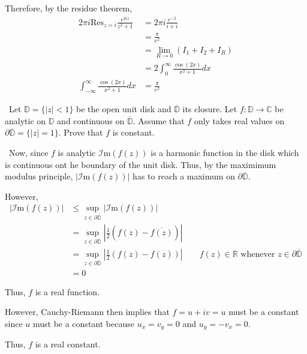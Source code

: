 \documentclass[12pt]{Homework}
\newcommand{\im}{\mathscr{I}\text{m}}
\newcommand{\res}{\text{Res}}
\begin{document}
\begin{solution}
Therefore, by the residue theorem, 
\begin{align*}
    2\pi i\res_{z=i}\frac{e^{2iz}}{z^2+1}&=2\pi i\frac{e^{-2}}{i+i}\\
    &=\frac{\pi}{e^2}\\
    &=\lim_{R\to0}(I_1+I_2+I_R)\\
    &=2\int_0^\infty\frac{\cos(2x)}{x^2+1}dx\\
    \int_{-\infty}^\infty\frac{\cos(2x)}{x^2+1}dx&=\frac{\pi}{e^2}
\end{align*}
\end{solution}
\newpage





\begin{problem} $\,$
Let $\mathbb{D}=\{|z|<1\}$ be the open unit disk and $\overline{\mathbb{D}}$ its closure. Let $f:\mathbb{D}\to\mathbb{C}$ be analytic on $\mathbb{D}$ and continuous on $\overline{\mathbb{D}}$. Assume that $f$ only takes real values on $\partial\overline{\mathbb{D}}=\{|z|=1\}.$ Prove that $f$ is constant.
\end{problem}


\begin{solution}$\,$
Now, since $f$ is analytic $\im(f(z))$ is a harmonic function in the disk which is continuous ont he boundary of the unit disk. Thus, by the maximimum modulus principle, $|\im(f(z))|$ has to reach a maximum on $\partial\overline{\mathbb{D}}$. 

However, \begin{align*}
    |\im(f(z))|&\le\sup_{z\in\partial\overline{\mathbb{D}}}|\im(f(z))|\\
    &=\sup_{z\in\partial\overline{\mathbb{D}}}|\frac{1}{2}(f(z)-\overline{f(z)})|\\
    &=\sup_{z\in\partial\overline{\mathbb{D}}}|\frac{1}{2}(f(z)-f(z))|\qquad f(z)\in\mathbb{R}\text{ whenever }z\in\partial\overline{\mathbb{D}}\\
    &=0
\end{align*}

Thus, $f$ is a real function. 

However, Cauchy-Riemann then implies that $f=u+iv=u$ must be a constant since $u$ must be a constant because $u_x=v_y=0$ and $u_y=-v_x=0$.

Thus, $f$ is a real constant.
\end{solution}
\end{document}
